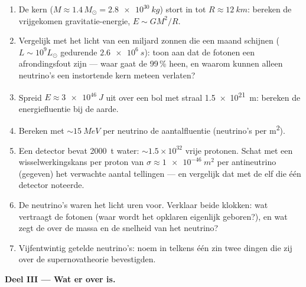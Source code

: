 \begin{problem}
\begin{enumerate}[resume]
  \item De kern ($M \approx 1.4\,M_\odot = \qty{2.8e30}{kg}$)
        stort in tot $R \approx \qty{12}{km}$: bereken de
        vrijgekomen gravitatie-energie, $E \sim GM^2/R$.
  \item Vergelijk met het licht van een miljard zonnen die een
        maand schijnen ($L \sim 10^{9}L_\odot$ gedurende $\qty{2.6e6}{s}$):
        toon aan dat de fotonen een afrondingsfout zijn --- waar gaat de
        99\,\% heen, en waarom kunnen alleen neutrino's een
        instortende kern meteen verlaten?
  \item Spreid $E \approx \qty{3e46}{J}$ uit over een bol met
        straal \qty{1.5e21}{m}: bereken de energiefluentie bij de
        aarde.
  \item Bereken met $\sim\qty{15}{MeV}$ per neutrino de
        aantalfluentie (neutrino's per \unit{m^2}).
  \item Een detector bevat \qty{2000}{t} water:
        ${\sim}1.5\times10^{32}$ vrije protonen. Schat met een
        wisselwerkingskans per proton van
        $\sigma \approx \qty{1e-46}{m^2}$ per antineutrino
        (gegeven) het verwachte aantal tellingen --- en vergelijk
        dat met de elf die één detector noteerde.
  \item De neutrino's waren het licht uren voor. Verklaar beide
        klokken: wat vertraagt de fotonen (waar wordt het
        opklaren eigenlijk geboren?), en wat zegt de
         over de massa en de snelheid van het neutrino?
  \item Vijfentwintig getelde neutrino's: noem in telkens één zin
        twee dingen die zij over de supernovatheorie bevestigden.
\end{enumerate}

\medskip\noindent\textbf{Deel III --- Wat er over is.}


\end{problem}
